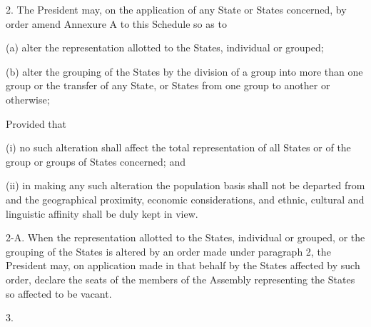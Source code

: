 2. The President may, on the application of any State or States concerned, by order amend Annexure A to this Schedule so as to\textemdash{}



(a) alter the representation allotted to the States, individual or grouped;



(b) alter the grouping of the States by the division of a group into more than one group or the transfer of any State, or States from one group to another or otherwise; 



Provided that\textemdash{} 



(i) no such alteration shall affect the total representation of all States or of the group or groups of States concerned; and 



(ii) in making any such alteration the population basis shall not be departed from and the geographical proximity, economic considerations, and ethnic, cultural and linguistic affinity shall be duly kept in view.



2-A. When the representation allotted to the States, individual or grouped, or the grouping of the States is altered by an order made under paragraph 2, the President may, on application made in that behalf by the States affected by such order, declare the seats of the members of the Assembly representing the States so affected to be vacant.



3. \hypertarget{jump_id_14}{}\hspace{0pt}

\hypertarget{jump_id_14}{}\added{}\hspace{0pt}

\hypertarget{jump_id_14}{}\hspace{0pt}

\hypertarget{jump_id_14}{}\added{}\hspace{0pt}

